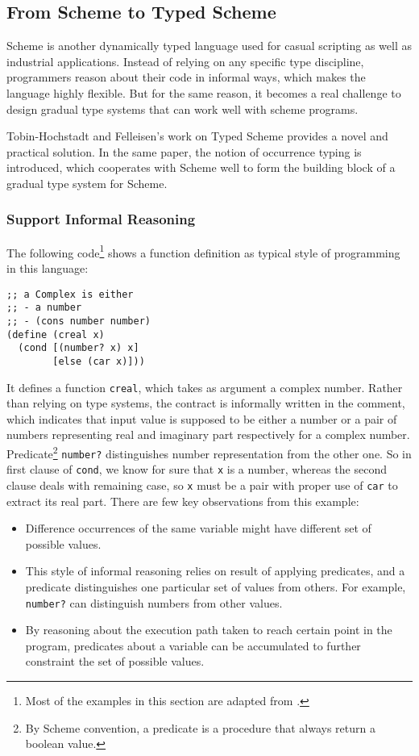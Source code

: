 \subsection{From Scheme to Typed Scheme}

Scheme is another dynamically typed language used
for casual scripting as well as industrial applications.
Instead of relying on any specific type discipline, programmers
reason about their code in informal ways,
which makes the language highly flexible.
But for the same reason,
it becomes a real challenge to design gradual type systems
that can work well with scheme programs.

Tobin-Hochstadt and Felleisen's work on Typed Scheme\cite{tobin2008design}
provides a novel and practical solution.
In the same paper, the notion of occurrence typing is introduced,
which cooperates with Scheme well to
form the building block of a gradual type system for Scheme.

\subsubsection{Support Informal Reasoning}

The following code\footnote{Most of the examples in this section are adapted from \cite{tobin2008design}.}
shows a function definition as typical style of programming in this language:

\begin{verbatim}
;; a Complex is either
;; - a number
;; - (cons number number)
(define (creal x)
  (cond [(number? x) x]
        [else (car x)]))
\end{verbatim}

It defines a function \texttt{creal}, which takes as argument
a complex number.
Rather than relying on type systems, the contract is informally written in the comment,
which indicates that input value is supposed to be either a number or
a pair of numbers representing real and imaginary part respectively for a complex number.
Predicate\footnote{By Scheme convention,
	a predicate is a procedure that always return a boolean value.
} \texttt{number?} distinguishes number representation from the other one.
So in first clause of \texttt{cond}, we know for sure that \texttt{x} is a number,
whereas the second clause deals with remaining case,
so \texttt{x} must be a pair with proper use of \texttt{car}
to extract its real part.
There are few key observations from this example:

\begin{itemize}
	\item Difference occurrences of the same variable might have different set of possible values.
	\item This style of informal reasoning relies on result of applying predicates, and 
	a predicate distinguishes one particular set of values from others.
	For example, \texttt{number?} can distinguish numbers from other values.
	\item By reasoning about the execution path taken to reach certain point in the program,
	predicates about a variable can be accumulated to further constraint the set of possible values.
\end{itemize}

